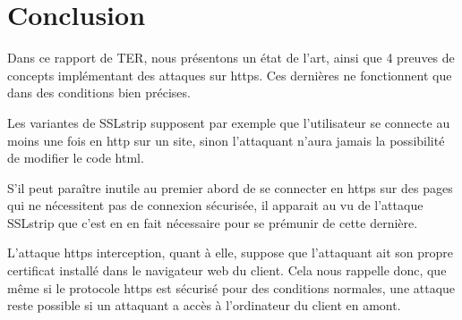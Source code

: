 \chapter*{Conclusion}


Dans ce rapport de TER, nous présentons un état de l'art, ainsi que 4 preuves de concepts implémentant des attaques sur https. Ces dernières ne fonctionnent que dans des conditions bien précises.

Les variantes de SSLstrip supposent par exemple que l'utilisateur se connecte au moins une fois en http sur un site, sinon l'attaquant n'aura jamais la possibilité de modifier le code html.

S'il peut paraître inutile au premier abord de se connecter en https sur des pages qui ne nécessitent pas de connexion sécurisée, il apparait au vu de l'attaque SSLstrip que c'est en en fait nécessaire pour se prémunir de cette dernière.

L'attaque https interception, quant à elle, suppose que l'attaquant ait son propre certificat installé dans le navigateur web du client. Cela nous rappelle donc, que même si le protocole https est sécurisé pour des conditions normales, une attaque reste possible si un attaquant a accès à l'ordinateur du client en amont.
